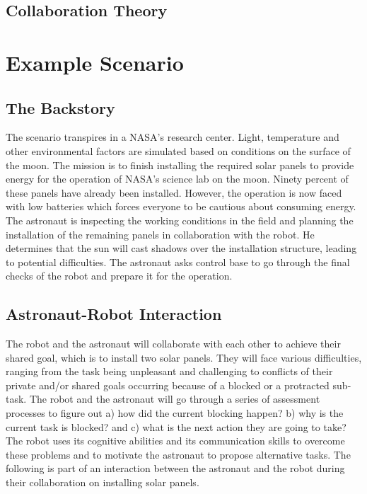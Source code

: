 \subsection{Collaboration Theory}
\label{sec:collaboration-theory}

\section{Example Scenario}
\label{sec:1}

\subsection{The Backstory}

The scenario transpires in a NASA's research center. Light, temperature and
other environmental factors are simulated based on conditions on the surface of
the moon. The mission is to finish installing the required solar panels to
provide energy for the operation of NASA's science lab on the moon. Ninety
percent of these panels have already been installed. However, the operation is
now faced with low batteries which forces everyone to be cautious about
consuming energy. The astronaut is inspecting the working conditions in the
field and planning the installation of the remaining panels in collaboration
with the robot. He determines that the sun will cast shadows over the
installation structure, leading to potential difficulties. The astronaut asks
control base to go through the final checks of the robot and prepare it for the
operation.

\subsection{Astronaut-Robot Interaction}

The robot and the astronaut will collaborate with each other to achieve their
shared goal, which is to install two solar panels. They will face various
difficulties, ranging from the task being unpleasant and challenging to
conflicts of their private and/or shared goals occurring because of a blocked or
a protracted sub-task. The robot and the astronaut will go through a series of
assessment processes to figure out a) how did the current blocking happen? b)
why is the current task is blocked? and c) what is the next action they are
going to take? The robot uses its cognitive abilities and its communication
skills to overcome these problems and to motivate the astronaut to propose
alternative tasks. The following is part of an interaction between the astronaut
and the robot during their collaboration on installing solar panels.

